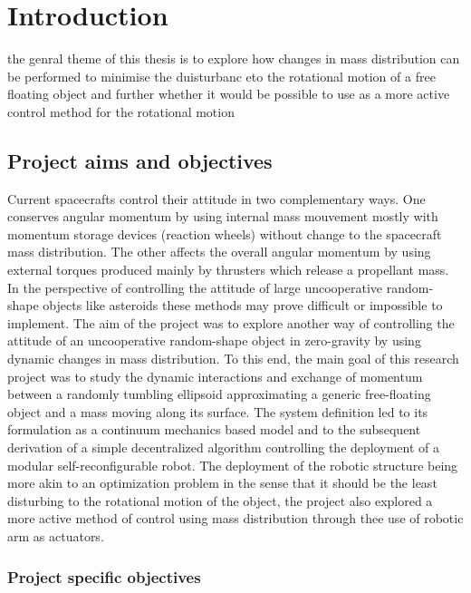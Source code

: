 
\chapter{Introduction}
\label{ch:introduction}

the genral theme of this thesis is to explore how changes in mass distribution can be performed to minimise the duisturbanc eto the rotational motion of a free floating object and further whether it would be possible to use as a more active control method for the rotational motion

\section{Project aims and objectives}
\label{ch:Project aims and objectives}
Current spacecrafts control their attitude in two complementary ways. One conserves angular momentum by using internal mass mouvement mostly with momentum storage devices (reaction wheels) without change to the spacecraft mass distribution. The other affects the overall angular momentum by using external torques produced mainly by thrusters which release a propellant mass. In the perspective of controlling the attitude of large uncooperative random-shape objects like asteroids these methods may prove difficult or impossible to implement. The aim of the project was to explore another way of controlling the attitude of an uncooperative random-shape object in zero-gravity by using dynamic changes in mass distribution. To this end, the main goal of this research project was to study the dynamic interactions and exchange of momentum between a randomly tumbling ellipsoid approximating a generic free-floating object and a mass moving along its surface. The system definition led to its formulation as a continuum mechanics based model and to the subsequent derivation of a simple decentralized algorithm controlling the deployment of a modular self-reconfigurable robot. The deployment of the robotic structure being more akin to an optimization problem in the sense that it should be the least disturbing to the rotational motion of the object, the project also explored a more active method of control using mass distribution through thee use of robotic arm as actuators.
\cite{ghc-pps}

\subsection{Project specific objectives}
\label{Project specific objectives}
